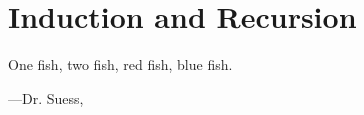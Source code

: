 \documentclass[../main.tex]{subfiles}
\begin{document}
\chapter{Induction and Recursion}
\epigraph{One fish, two fish, red fish, blue fish.}
{---Dr. Suess, \cite{one-fish-two-fish}}



\end{document}
